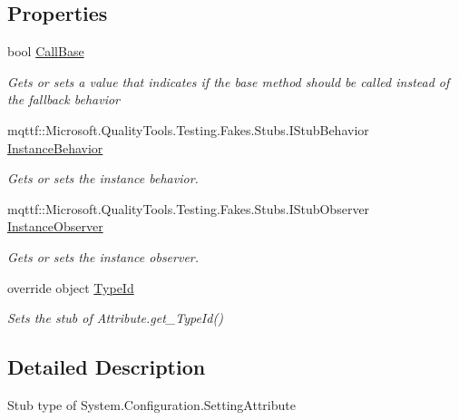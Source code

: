 \subsection*{Properties}
\begin{DoxyCompactItemize}
\item 
bool \hyperlink{class_system_1_1_configuration_1_1_fakes_1_1_stub_setting_attribute_aab5839304448177ba91273223729c0a6}{Call\-Base}
\begin{DoxyCompactList}\small\item\em Gets or sets a value that indicates if the base method should be called instead of the fallback behavior\end{DoxyCompactList}\item 
mqttf\-::\-Microsoft.\-Quality\-Tools.\-Testing.\-Fakes.\-Stubs.\-I\-Stub\-Behavior \hyperlink{class_system_1_1_configuration_1_1_fakes_1_1_stub_setting_attribute_acd2fecb54a0b95f80421f7609b71c882}{Instance\-Behavior}
\begin{DoxyCompactList}\small\item\em Gets or sets the instance behavior.\end{DoxyCompactList}\item 
mqttf\-::\-Microsoft.\-Quality\-Tools.\-Testing.\-Fakes.\-Stubs.\-I\-Stub\-Observer \hyperlink{class_system_1_1_configuration_1_1_fakes_1_1_stub_setting_attribute_ad63a3da1277ad992706ec84a256878ea}{Instance\-Observer}
\begin{DoxyCompactList}\small\item\em Gets or sets the instance observer.\end{DoxyCompactList}\item 
override object \hyperlink{class_system_1_1_configuration_1_1_fakes_1_1_stub_setting_attribute_a2f5d40ad7634f731f2a8fd0fc068c35e}{Type\-Id}
\begin{DoxyCompactList}\small\item\em Sets the stub of Attribute.\-get\-\_\-\-Type\-Id()\end{DoxyCompactList}\end{DoxyCompactItemize}


\subsection{Detailed Description}
Stub type of System.\-Configuration.\-Setting\-Attribute



